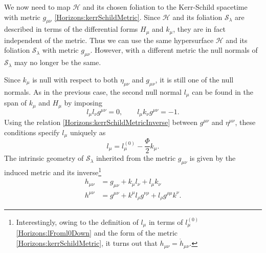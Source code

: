 We now need to map $\mathcal{H}$ and its chosen foliation to the Kerr-Schild spacetime with metric $g_{\mu \nu}$
\eqref{Horizons:kerrSchildMetric}. Since $\mathcal{H}$ and its foliation $\mathcal{S}_{\lambda}$ are described in terms of
the differential forms $H_{\mu}$ and $k_{\mu}$, they are in fact independent of the metric. Thus we can use the
same hypersurface $\mathcal{H}$ and its foliation $\mathcal{S}_{\lambda}$ with metric $g_{\mu \nu}$.
However, with a different metric the null normals of $\mathcal{S}_{\lambda}$ may no longer be the same.

Since $k_{\mu}$ is null with respect to both $\eta_{\mu \nu}$ and $g_{\mu \nu}$, it is still one of the null
normals. As in the previous case, the second null normal $l_{\mu}$ can be found in the span of $k_{\mu}$ and $H_{\mu}$ by imposing
\begin{equation} \label{Horizons:lConditions} 
    l_{\mu} l_{\nu} g^{\mu \nu} = 0, \qquad l_{\mu} k_{\nu} g^{\mu \nu} = -1.
\end{equation}
Using the relation \eqref{Horizons:kerrSchildMetricInverse} between $g^{\mu \nu}$ and $\eta^{\mu \nu}$, these conditions
specify $l_{\mu}$ uniquely as
\begin{equation} \label{Horizons:lFroml0Down} 
    l_{\mu} = l^{(0)}_{\mu} - \frac{\Phi}{2} k_{\mu}.
\end{equation}
The intrinsic geometry of $\mathcal{S}_{\lambda}$ inherited from the metric $g_{\mu \nu}$ is given by the
induced metric and its inverse\footnote{Interestingly, owing to the
definition of $l_{\mu}$ in terms of $l^{(0)}_{\mu}$ \eqref{Horizons:lFroml0Down} and the form of the metric \eqref{Horizons:kerrSchildMetric}, it turns
out that $h_{\mu \nu} = \mathring{h}_{\mu \nu}$.}
\begin{equation} \label{Horizons:curvedInducedMetric} 
    \begin{split}
        h_{\mu \nu} &= g_{\mu \nu} + k_{\mu} l_{\nu} + l_{\mu} k_{\nu} \\
        h^{\mu \nu} &= g^{\mu \nu} + k^{\mu} l_{\rho} g^{\nu \rho} + l_{\rho} g^{\rho \mu} k^{\nu}.
    \end{split}
\end{equation}

